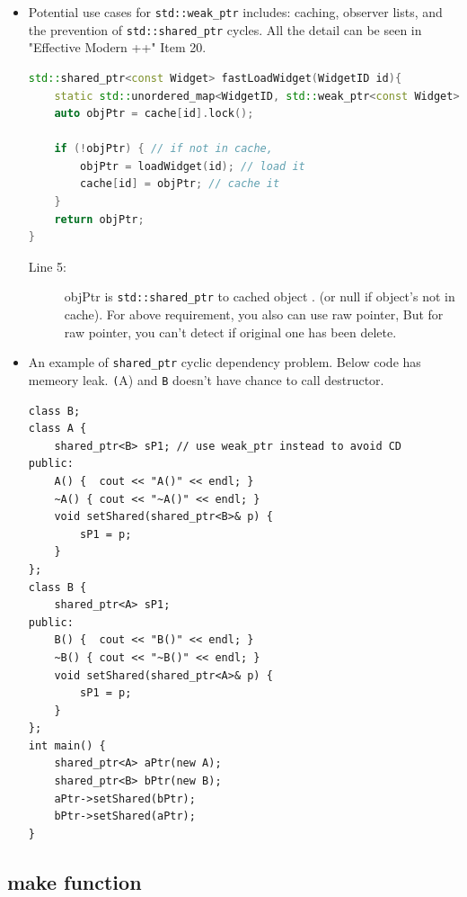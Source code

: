 \documentclass[a4paper,11pt,twoside]{book}
\begin{document}
\begin{itemize}
    \item Potential use cases for \texttt{std::weak\_ptr} includes: caching, observer lists, and the prevention of \texttt{std::shared\_ptr} cycles.  All the detail can be seen in "Effective Modern ++" Item 20.
\begin{lstlisting}[frame=single, language=c++]
std::shared_ptr<const Widget> fastLoadWidget(WidgetID id){
	static std::unordered_map<WidgetID, std::weak_ptr<const Widget>> cache;
	auto objPtr = cache[id].lock();

	if (!objPtr) { // if not in cache,
		objPtr = loadWidget(id); // load it
		cache[id] = objPtr; // cache it
	}
	return objPtr;
}
\end{lstlisting}
\begin{description}
	\item[Line 5:] objPtr is \texttt{std::shared\_ptr} to cached object . (or null if object's not in cache). For above requirement, you also can use raw pointer, But for raw pointer, you can't detect if original one has been delete. 
\end{description}

    \item An example of \texttt{shared\_ptr} cyclic dependency problem. Below code has memeory leak. \texttt(A) and \texttt{B} doesn't have chance to call destructor.
\begin{lstlisting}[]
class B;
class A {
    shared_ptr<B> sP1; // use weak_ptr instead to avoid CD
public:
    A() {  cout << "A()" << endl; }
    ~A() { cout << "~A()" << endl; }
    void setShared(shared_ptr<B>& p) {
        sP1 = p;
    }
};
class B {
    shared_ptr<A> sP1;
public:
    B() {  cout << "B()" << endl; }
    ~B() { cout << "~B()" << endl; }
    void setShared(shared_ptr<A>& p) {
        sP1 = p;
    }
};
int main() {
    shared_ptr<A> aPtr(new A);
    shared_ptr<B> bPtr(new B);
    aPtr->setShared(bPtr);
    bPtr->setShared(aPtr);
}
\end{lstlisting}

\end{itemize}

\subsection{make function}
\end{document}
